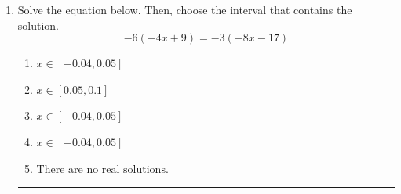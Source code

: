 \documentclass[14pt]{extbook}
\newcommand{\litem}[1]{\item#1\hspace*{-1cm}\rule{\textwidth}{0.4pt}}
\begin{document}
\begin{enumerate}
{\begin{enumerate}[label=\Alph*.]
\end{enumerate} }
\litem{
Solve the equation below. Then, choose the interval that contains the solution.\[ -6(-4x + 9) = -3(-8x -17) \]\begin{enumerate}[label=\Alph*.]
\item \( x \in [-0.04, 0.05] \)
\item \( x \in [0.05, 0.1] \)
\item \( x \in [-0.04, 0.05] \)
\item \( x \in [-0.04, 0.05] \)
\item \( \text{There are no real solutions.} \)

\end{enumerate} }
\end{enumerate}
\end{document}
